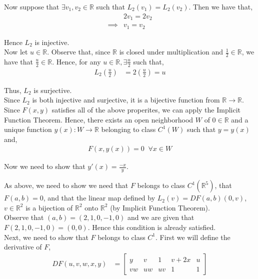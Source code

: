 \documentclass[12pt]{article}
\newenvironment{problem}[2][Problem]{\begin{trivlist}
\item[\hskip \labelsep {\bfseries #1}\hskip \labelsep {\bfseries #2.}]}{\end{trivlist}}
\begin{document}
Now suppose that $\exists v_1, v_2 \in \mathbb{R}$ such that $L_2(v_1) = L_2(v_2)$. Then we have that,
\begin{align*}
&2v_1 = 2v_2\\
\implies &v_1 = v_2
\end{align*}

Hence $L_2$ is injective.\\

Now let $u \in \mathbb{R}$. Observe that, since $\mathbb{R}$ is closed under multiplication and $\frac{1}{2} \in \mathbb{R}$, we have that $\frac{u}{2} \in \mathbb{R}$. Hence, for any $u \in \mathbb{R}, \exists \frac{u}{2}$ such that,
\begin{align*}
L_2\left(\frac{u}{2}\right) &= 2\left(\frac{u}{2}\right) = u
\end{align*}

Thus, $L_2$ is surjective.\\

Since $L_2$ is both injective and surjective, it is a bijective function from $\mathbb{R} \to \mathbb{R}$.\\

Since $F(x, y)$ satisfies all of the above properites, we can apply the Implicit Function Theorem. Hence, there exists an open neighborhood $W$ of $0 \in \mathbb{R}$ and a unique function $y(x): W \to \mathbb{R}$ belonging to class $C^1(W)$ such that $y = y(x)$ and,
\begin{align*}
F(x, y(x)) = 0 \;\; \forall x \in W
\end{align*}

Now we need to show that $y'(x) = \frac{-x}{y}$.

\begin{problem}{2}
\end{problem}

As above, we need to show  we need that $F$ belongs to class $C^1(\mathbb{R}^5)$, that $F(a, b) = 0$, and that the linear map defined by $L_2(v) = DF(a, b)(0, v)$, $v \in \mathbb{R}^2$ is a bijection of $\mathbb{R}^2$ onto $\mathbb{R}^2$ (by Implicit Function Theorem).\\

Observe that $(a, b) = (2, 1, 0, -1, 0)$ and we are given that $F(2, 1, 0, -1, 0) = (0, 0)$. Hence this condition is already satisfied.\\

Next, we need to show that $F$ belongs to class $C^1$. First we will define the derivative of $F$,
\begin{align*}
DF(u, v, w, x, y) &= \begin{bmatrix}
y & v & 1 & v + 2x & u\\
vw & uw & uv & 1 & 1
\end{bmatrix}
\end{align*}
\end{document}
